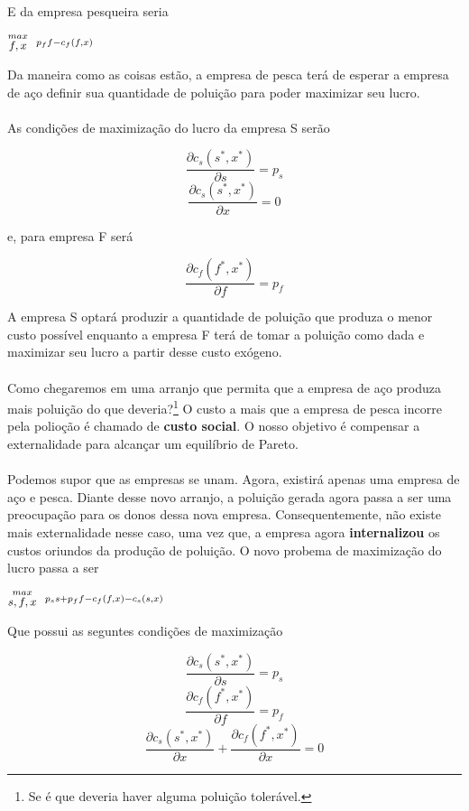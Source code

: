 \documentclass[a4paper,11pt,oneside]{book}
\theoremstyle{definition}
\theoremstyle{break}
\begin{document}
E da empresa pesqueira seria

\begin{center}
	\LARGE $ \stackrel{max}{\text{\small $f,x$}} \ \ %
	\stackrel{p_f f - c_f(f,x)}{\ } $ %
\end{center}

Da maneira como as coisas estão, a empresa de pesca terá de esperar a empresa de aço definir sua quantidade de poluição para poder maximizar seu lucro.
\\
\\
As condições de maximização do lucro da empresa S serão

$$ \frac{\partial c_s(s^*,x^*)}{\partial s} = p_s $$
$$ \frac{\partial c_s(s^*,x^*)}{\partial x} = 0 $$

e, para empresa F será

$$ \frac{\partial c_f(f^*,x^*)}{\partial f} = p_f $$

A empresa S optará produzir a quantidade de poluição que produza o menor custo possível enquanto a empresa F terá de tomar a poluição como dada e maximizar seu lucro a partir desse custo exógeno.
\\
\\
Como chegaremos em uma arranjo que permita que a empresa de aço produza mais poluição do que deveria?\footnote{Se é que deveria haver alguma poluição tolerável.} O custo a mais que a empresa de pesca incorre pela polioção é chamado de \textbf{custo social}. O nosso objetivo é compensar a externalidade para alcançar um equilíbrio de Pareto.
\\
\\
Podemos supor que as empresas se unam. Agora, existirá apenas uma empresa de aço e pesca. Diante desse novo arranjo, a poluição gerada agora passa a ser uma preocupação para os donos dessa nova empresa. Consequentemente, não existe mais externalidade nesse caso, uma vez que, a empresa agora \textbf{internalizou} os custos oriundos da produção de poluição. O novo probema de maximização do lucro passa a ser

\begin{center}
	\LARGE $ \stackrel{max}{\text{\small $s,f,x$}} \ \ %
	\stackrel{p_s s + p_f f - c_f(f,x) - c_s(s,x)}{\ } $ %
\end{center}

Que possui as seguntes condições de maximização

$$ \frac{\partial c_s(s^*,x^*)}{\partial s} = p_s $$
$$ \frac{\partial c_f(f^*,x^*)}{\partial f} = p_f $$
$$ \frac{\partial c_s(s^*,x^*)}{\partial x} + \frac{\partial c_f(f^*,x^*)}{\partial x}= 0 $$
\end{document}
